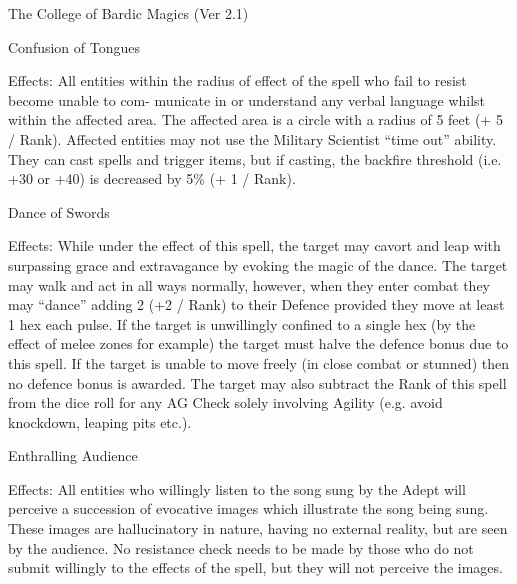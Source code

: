 \begin{Chapter}{The College of Bardic Magics (Ver 2.1)}
\begin{spell}[S-4]{Confusion of Tongues }

Effects:  All  entities  within  the  radius  of  effect  of 
the spell  who fail to  resist become unable to com-
municate  in  or  understand  any  verbal  language 
whilst within the affected area. The affected area is 
a  circle  with  a  radius  of  5  feet  (+  5  /  Rank).  Affected  entities  may  not  use  the  Military  Scientist 
“time out” ability. They can cast spells and trigger 
items,  but  if  casting,  the  backfire  threshold  (i.e. 
+30 or +40) is decreased by 5\% (+ 1 / Rank). 
\end{spell}

\begin{spell}[S-5]{Dance of Swords }

Effects:  While  under  the  effect  of  this  spell,  the 
target  may  cavort  and  leap  with  surpassing  grace 
and  extravagance  by  evoking  the  magic  of  the 
dance.  The  target  may  walk  and  act  in  all  ways 
normally,  however,  when  they  enter  combat  they 
may “dance” adding 2 (+2 / Rank) to their Defence 
provided they move at least 1 hex each pulse. If the 
target  is  unwillingly  confined  to  a  single  hex  (by 
the  effect  of  melee  zones  for  example)  the  target 
must  halve  the  defence  bonus  due  to  this  spell.  If 
the target is unable to move freely (in close combat 
or stunned) then no defence bonus is awarded. The 
target may also subtract the Rank of this spell from 
the  dice  roll  for  any  AG  Check  solely  involving 
Agility (e.g. avoid knockdown, leaping pits etc.). 
\end{spell}

\begin{spell}[S-6]{Enthralling Audience }

Effects: All entities who willingly listen to the song 
sung  by  the  Adept  will  perceive  a  succession  of 
evocative  images  which  illustrate  the  song  being 
sung.  These  images  are  hallucinatory  in  nature, 
having  no  external  reality,  but  are  seen  by  the 
audience. No resistance check needs to be made by 
those who do not submit willingly to the effects of 
the  spell,  but  they  will  not  perceive  the  images. 


\end{spell}
\end{Chapter}

